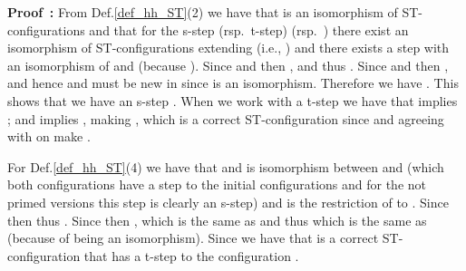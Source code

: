 \documentclass[submission,copyright,creativecommons]{eptcs}
\newtheorem{theorem}{Theorem}[section]
\newenvironment{proof}[1][\!\!\,]{\vspace{1ex}\noindent\textbf{Proof #1: }}{\hfill\vspace{2ex}}
\newcommand{\cp}[1]{}
\newcounter{case}
\newcommand\hHDML{\ensuremath{\mathit{hHDML}}}
\newcommand\hhequiv{\ensuremath{\stackrel{hh}{\sim}}}
\begin{document}
{{\begin{proof}
From Def.\ref{def_hh_ST}(2) we have that  is an isomorphism of ST-configurations and that for the s-step (rsp.\ t-step)  (rsp.\ ) there exist an isomorphism of ST-configurations  extending  (i.e., ) and there exists a step  with  an isomorphism of  and  (because ). Since  and  then , and thus . Since  and  then , and hence  and  must be new in  since  is an isomorphism. Therefore we have . This shows that we have an s-step . When we work with a t-step we have that  implies ; and  implies , making , which is a correct ST-configuration since  and  agreeing with  on  make .

For Def.\ref{def_hh_ST}(4) we have that  and  is isomorphism between  and  (which both configurations have a step to the initial configurations and for the not primed versions this step is clearly an s-step) and is the restriction of  to . Since  then  thus . Since  then , which is the same as  and thus  which is the same as  (because of  being an isomorphism). Since  we have that  is a correct ST-configuration that has a t-step to the configuration .
\end{proof}
}

\cp{!!!Maybe leave this for a journal version.}

\cp{
\begin{theorem}[modal equivalence and\ \ \hhequiv]\label{th_hhSTmodal}
For rooted, connected, and adjacent-closed ST-structures, the modal equivalence induced by \hHDML\ coincides with \hhequiv\ when considering image-finite structures of finite concurrency.
\end{theorem}

\begin{proof}
The easy part of the proof is to show that . This means showing that for two structures  and two ST-configurations , with  the required isomorphism given by \hhequiv, we have that  iff , for any \hHDML\ formula . The proof is by induction on the structure of the formula  where the base case and the propositional logical operators are easy. We argue for the four modalities.

When  the fact that  is equivalent by semantics of Def.\ref{def_sem_hHDML_ST} to the fact that there exists an s-step  with . Where from the hh-equivalence of the two configurations we have that there exists also a step  with , which by Lemma~\ref{lemma_hhMimicsSteps} is also an s-step. Now using the inductive hypothesis with  and  we get that , hence by the semantic definition being equivalent to .


\end{proof}}}
\end{document}

